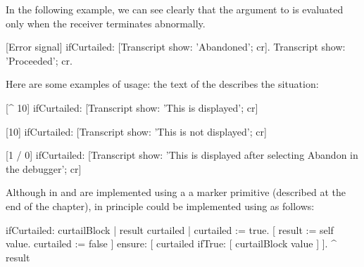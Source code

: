 \documentclass[a4paper,10pt,twoside]{book}
\begin{document}
In the following example, we can see clearly that the argument to  is evaluated only when the receiver terminates abnormally.
\begin{code}{}
[Error signal] ifCurtailed: [Transcript show: 'Abandoned'; cr].
Transcript show: 'Proceeded'; cr.
\end{code}


Here are some  examples of  usage: the text of the  describes the situation:

\begin{code}{}
[^ 10] ifCurtailed: [Transcript show: 'This is displayed'; cr] 

[10] ifCurtailed: [Transcript show: 'This is not displayed'; cr] 

[1 / 0] ifCurtailed: [Transcript show: 'This is displayed after selecting Abandon in the debugger'; cr]
\end{code}

Although in \pharo {} and  are implemented using a a marker primitive (described at the end of the chapter), 
in principle  could be implemented using  as follows:

\begin{code}{}
ifCurtailed: curtailBlock
	| result curtailed |
	curtailed := true.
	[	result := self value.
		curtailed := false
	]	ensure: [ curtailed ifTrue: [ curtailBlock value ] ].
	^ result
\end{code}
\end{document}
